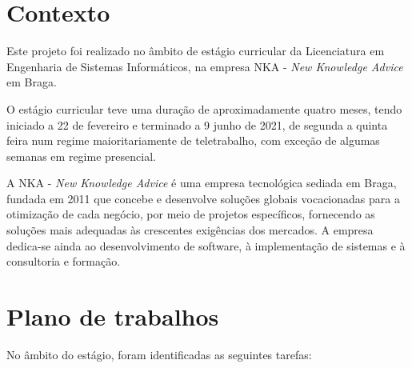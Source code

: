 
\section{Contexto}
\par Este projeto foi realizado no âmbito de estágio curricular da Licenciatura em Engenharia de Sistemas Informáticos, na empresa NKA - \textit{New Knowledge Advice} em Braga.
\par O estágio curricular teve uma duração de aproximadamente quatro meses, tendo iniciado a 22 de fevereiro e terminado a 9 junho de 2021, de segunda a quinta feira num regime maioritariamente de teletrabalho, com exceção de algumas semanas em regime presencial.
\par A NKA - \textit{New Knowledge Advice} é uma empresa tecnológica sediada em Braga, fundada em 2011 que concebe e desenvolve soluções globais vocacionadas para a otimização de cada negócio, por meio de projetos específicos, fornecendo as soluções mais adequadas às crescentes exigências dos mercados. A empresa dedica-se ainda ao desenvolvimento de software, à implementação de sistemas e à consultoria e formação\citep{nka}.

\section{Plano de trabalhos}

No âmbito do estágio, foram identificadas as seguintes tarefas:

